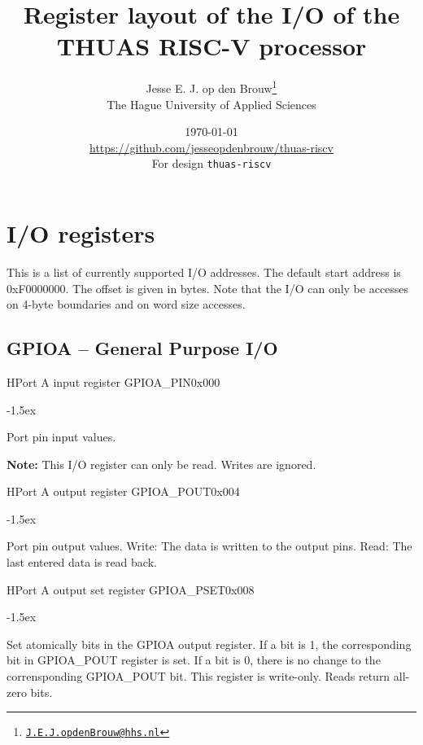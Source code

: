 \documentclass[12pt]{article}
\author{Jesse E. J. op den Brouw\thanks{\href{mailto:J.E.J.opdenBrouw@hhs.nl}{\texttt{J.E.J.opdenBrouw@hhs.nl}}}\\[2ex]The Hague University of Applied Sciences}
\title{Register layout of the I/O of the THUAS RISC-V processor}
\date{\today\\[2ex]\normalsize\url{https://github.com/jesseopdenbrouw/thuas-riscv}\\[2ex]For design \texttt{thuas-riscv}}
\begin{document}
\appendix
\setcounter{section}{2}

\section{I/O registers}
\label{sec:ioregisters}
This is a list of currently supported I/O addresses. 
The default start address is 0xF0000000. The offset is given in bytes. Note that the I/O can only be accesses on 4-byte boundaries and on word size accesses.


\subsection{GPIOA -- General Purpose I/O}

\begin{register}{H}{Port A input register GPIOA\_PIN}{0x000}%
\label{pinx}%
\regnewline%
\end{register}
\begin{regdesc}[0.7\textwidth]\begin{reglist}[000000]
\itemsep-1.5ex
\item[PIN] Port pin input values.
\end{reglist}\end{regdesc}
\textbf{Note:} This I/O register can only be read. Writes are ignored.

\begin{register}{H}{Port A output register GPIOA\_POUT}{0x004}%
\label{poutx}%
\regnewline%
\end{register}
\begin{regdesc}[0.7\textwidth]\begin{reglist}[000000]
\itemsep-1.5ex
\item[POUT] Port pin output values. Write: The data is written to the output pins. Read: The last entered data is read back.
\end{reglist}\end{regdesc}

\begin{register}{H}{Port A output set register GPIOA\_PSET}{0x008}%
\label{pset}%
\regnewline%
\end{register}
\begin{regdesc}[0.7\textwidth]\begin{reglist}[000000]
\itemsep-1.5ex
\item[PSET] Set atomically bits in the GPIOA output register. If a bit is 1, the corresponding bit in GPIOA\_POUT register is set. If a bit is 0, there is no change to the corrensponding GPIOA\_POUT bit. This register is write-only. Reads return all-zero bits.
\end{reglist}\end{regdesc}
\end{document}
